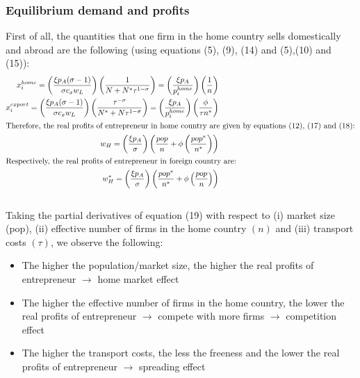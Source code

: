 \documentclass[11pt]{article}
\begin{document}
	\subsubsection{Equilibrium demand and profits}
	First of all, the quantities that one firm in the home country sells domestically and abroad are the following (using equations (5), (9), (14) and (5),(10) and (15)):
	\begin{align}
x_{i}^{home}=\left(\frac{\xi p_{A}(\sigma-1)}{\sigma c_{x} w_{L}}\right) \left(\frac{1}{N+N^{\ast} \tau^{1- \sigma}}\right)=\left(\frac{\xi p_{A}}{ p_{i}^{home}}\right)\left(\frac{1}{n}\right) \\
x_{i}^{export}=\left(\frac{\xi p_{A}(\sigma-1)}{\sigma c_{x} w_{L}}\right) \left(\frac{\tau^{-\sigma}}{N^{\ast}+N \tau^{1- \sigma}}\right)=\left(\frac{\xi p_{A}}{ p_{i}^{home}}\right)\left(\frac{\phi}{\tau n^\ast}\right) \\
\intertext{Therefore, the real profits of entrepreneur in home country are given by equations (12), (17) and (18):}
w_{H}=\left(\frac{\xi p_{A}}{\sigma}\right) \left(\frac{pop}{n}+\phi\left(\frac{pop^\ast}{n^\ast}\right)\right) \\
\intertext{Respectively, the real profits of entrepreneur in foreign country are:}
w_{H}^{\ast}=\left(\frac{\xi p_{A}}{\sigma}\right) \left(\frac{pop^\ast}{n^\ast}+\phi\left(\frac{pop}{n}\right)\right)
\end{align} \\ 
Taking the partial derivatives of equation (19) with respect to (i) market size (pop), (ii) effective number of firms in the home country $(n)$ and (iii) transport costs $(\tau)$, we observe the following:
\begin{itemize}
\item The higher the population/market size, the higher the real profits of entrepreneur $\to$ home market effect
\item The higher the effective number of firms in the home country, the lower the real profits of entrepreneur $\to$ compete with more firms $\to$ competition effect
\item The higher the transport costs, the less the freeness and the lower the real profits of entrepreneur $\to$ spreading effect
\end{itemize}
\end{document}
